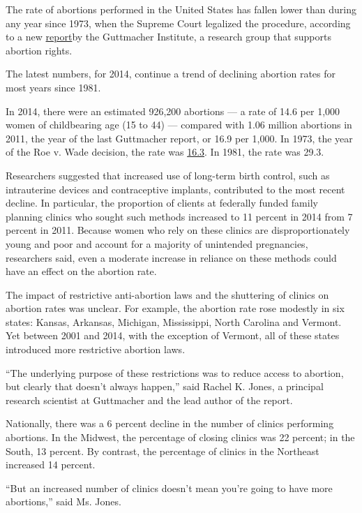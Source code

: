 The rate of abortions performed in the United States has fallen lower
than during any year since 1973, when the Supreme Court legalized the
procedure, according to a new
\href{http://onlinelibrary.wiley.com/doi/10.1363/psrh.12015/full}{report}by
the Guttmacher Institute, a research group that supports abortion
rights.

The latest numbers, for 2014, continue a trend of declining abortion
rates for most years since 1981.

In 2014, there were an estimated 926,200 abortions --- a rate of 14.6
per 1,000 women of childbearing age (15 to 44) --- compared with 1.06
million abortions in 2011, the year of the last Guttmacher report, or
16.9 per 1,000. In 1973, the year of the Roe v. Wade decision, the rate
was
\href{https://www.guttmacher.org/sites/default/files/article_files/4000608.pdf}{16.3}.
In 1981, the rate was 29.3.

Researchers suggested that increased use of long-term birth control,
such as intrauterine devices and contraceptive implants, contributed to
the most recent decline. In particular, the proportion of clients at
federally funded family planning clinics who sought such methods
increased to 11 percent in 2014 from 7 percent in 2011. Because women
who rely on these clinics are disproportionately young and poor and
account for a majority of unintended pregnancies, researchers said, even
a moderate increase in reliance on these methods could have an effect on
the abortion rate.

The impact of restrictive anti-abortion laws and the shuttering of
clinics on abortion rates was unclear. For example, the abortion rate
rose modestly in six states: Kansas, Arkansas, Michigan, Mississippi,
North Carolina and Vermont. Yet between 2001 and 2014, with the
exception of Vermont, all of these states introduced more restrictive
abortion laws.

``The underlying purpose of these restrictions was to reduce access to
abortion, but clearly that doesn't always happen,'' said Rachel K.
Jones, a principal research scientist at Guttmacher and the lead author
of the report.

Nationally, there was a 6 percent decline in the number of clinics
performing abortions. In the Midwest, the percentage of closing clinics
was 22 percent; in the South, 13 percent. By contrast, the percentage of
clinics in the Northeast increased 14 percent.

``But an increased number of clinics doesn't mean you're going to have
more abortions,'' said Ms. Jones.


